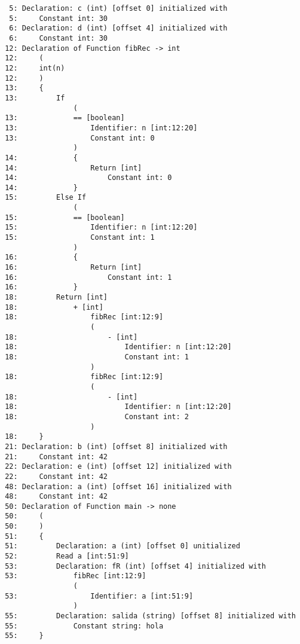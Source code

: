 \documentclass[oneside,12pt,letterpaper]{article}
\theoremstyle{definition} \newtheorem{definicion}{Definici\'{o}n}
\theoremstyle{plain} \newtheorem{teorema}{Teorema}
\theoremstyle{plain} \newtheorem{lema}{Lema}
\begin{document}
\begin{verbatim}
  5: Declaration: c (int) [offset 0] initialized with
  5:     Constant int: 30
  6: Declaration: d (int) [offset 4] initialized with
  6:     Constant int: 30
 12: Declaration of Function fibRec -> int
 12:     (
 12:     int(n)
 12:     )
 13:     {
 13:         If
                 (
 13:             == [boolean]
 13:                 Identifier: n [int:12:20]
 13:                 Constant int: 0
                 )
 14:             {
 14:                 Return [int]
 14:                     Constant int: 0
 14:             }
 15:         Else If
                 (
 15:             == [boolean]
 15:                 Identifier: n [int:12:20]
 15:                 Constant int: 1
                 )
 16:             {
 16:                 Return [int]
 16:                     Constant int: 1
 16:             }
 18:         Return [int]
 18:             + [int]
 18:                 fibRec [int:12:9]
                     (
 18:                     - [int]
 18:                         Identifier: n [int:12:20]
 18:                         Constant int: 1
                     )
 18:                 fibRec [int:12:9]
                     (
 18:                     - [int]
 18:                         Identifier: n [int:12:20]
 18:                         Constant int: 2
                     )
 18:     }
 21: Declaration: b (int) [offset 8] initialized with
 21:     Constant int: 42
 22: Declaration: e (int) [offset 12] initialized with
 22:     Constant int: 42
 48: Declaration: a (int) [offset 16] initialized with
 48:     Constant int: 42
 50: Declaration of Function main -> none
 50:     (
 50:     )
 51:     {
 51:         Declaration: a (int) [offset 0] unitialized
 52:         Read a [int:51:9]
 53:         Declaration: fR (int) [offset 4] initialized with
 53:             fibRec [int:12:9]
                 (
 53:                 Identifier: a [int:51:9]
                 )
 55:         Declaration: salida (string) [offset 8] initialized with
 55:             Constant string: hola
 55:     }
\end{verbatim}
\end{document}
